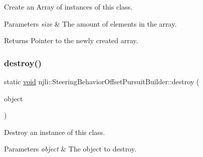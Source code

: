 Create an Array of instances of this class.


\begin{DoxyParams}{Parameters}
{\em size} & The amount of elements in the array.\\
\hline
\end{DoxyParams}
\begin{DoxyReturn}{Returns}
Pointer to the newly created array. 
\end{DoxyReturn}
\mbox{\label{classnjli_1_1_steering_behavior_offset_pursuit_builder_a0d9c714c1aed28d8cb6b5285e5196d2b}} 
\subsubsection{\texorpdfstring{destroy()}{destroy()}}
{\footnotesize\ttfamily static \mbox{\hyperlink{_thread_8h_af1e856da2e658414cb2456cb6f7ebc66}{void}} njli\+::\+Steering\+Behavior\+Offset\+Pursuit\+Builder\+::destroy (\begin{DoxyParamCaption}\item[{\mbox{\hyperlink{classnjli_1_1_steering_behavior_offset_pursuit_builder}{Steering\+Behavior\+Offset\+Pursuit\+Builder}} $\ast$}]{object }\end{DoxyParamCaption})\hspace{0.3cm}{\ttfamily [static]}}

Destroy an instance of this class.


\begin{DoxyParams}{Parameters}
{\em object} & The object to destroy. \\
\hline
\end{DoxyParams}
\mbox{\label{classnjli_1_1_steering_behavior_offset_pursuit_builder_a06985bc631aceb9ffaadbcdbe3fca0a2}} 
